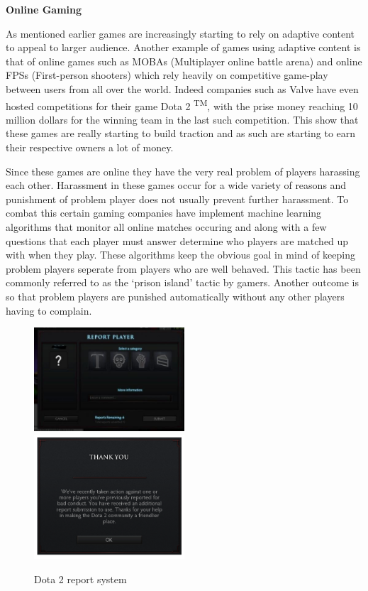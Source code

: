 \documentclass[11pt]{article}
\begin{document}
\vspace{4.0 mm}
\textbf{Online Gaming}
\vspace{4.0 mm}

As mentioned earlier games are increasingly starting to rely on adaptive content to appeal to larger audience. Another example of games using adaptive content is that of online games such as MOBAs (Multiplayer online battle arena) and online FPSs (First-person shooters) which rely heavily on competitive game-play between users from all over the world. Indeed companies such as Valve have even hosted competitions for their game Dota 2 \textsuperscript{TM}, with the prise money reaching 10 million dollars for the winning team in the last such competition. This show that these games are really starting to build traction and as such are starting to earn their respective owners a lot of money.
\vspace{7.0 mm}

Since these games are online they have the very real problem of players harassing each other. Harassment in these games occur for a wide variety of reasons and punishment of problem player does not usually prevent further harassment.  To combat this certain gaming companies have implement machine learning algorithms that monitor all online matches occuring and along with a few questions that each player must answer determine who players are matched up with when they play. These algorithms keep the obvious goal in mind of keeping problem players seperate from players who are well behaved. This tactic has been commonly referred to as the `prison island' tactic by gamers. Another outcome is so that problem players are punished automatically without any other players having to complain.
\vspace{4.0 mm}

\begin{figure}[h!]
    \centering
    \includegraphics[width=0.5\textwidth]{report.jpg}
    \includegraphics[width=0.5\textwidth]{question.png}
    \caption{Dota 2 report system}
\end{figure}
\vspace{4.0 mm}
\end{document}
